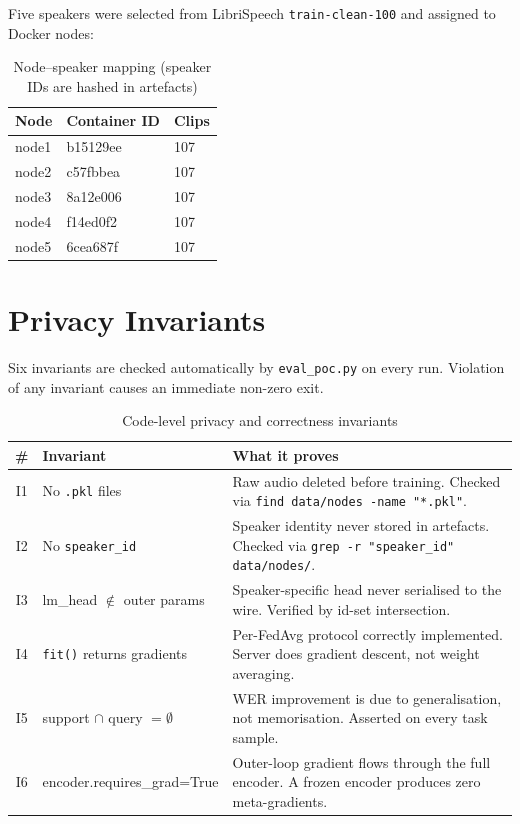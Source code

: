 \documentclass[11pt,a4paper]{article}
\theoremstyle{definition}
\begin{document}
Five speakers were selected from LibriSpeech \texttt{train-clean-100} and
assigned to Docker nodes:

\begin{table}[H]
\centering
\caption{Node--speaker mapping (speaker IDs are hashed in artefacts)}
\begin{tabular}{lll}
\toprule
\textbf{Node} & \textbf{Container ID} & \textbf{Clips}\\
\midrule
node1 & b15129ee & 107\\
node2 & c57fbbea & 107\\
node3 & 8a12e006 & 107\\
node4 & f14ed0f2 & 107\\
node5 & 6cea687f & 107\\
\bottomrule
\end{tabular}
\end{table}

\section{Privacy Invariants}

\label{sec:invariants}

Six invariants are checked automatically by \texttt{eval\_poc.py} on every run.
Violation of any invariant causes an immediate non-zero exit.

\begin{table}[H]
\centering
\caption{Code-level privacy and correctness invariants}
\label{tab:invariants}
\begin{tabular}{clp{7cm}}
\toprule
\textbf{\#} & \textbf{Invariant} & \textbf{What it proves}\\
\midrule
I1 & No \texttt{.pkl} files & Raw audio deleted before training.  Checked via
     \texttt{find data/nodes -name "*.pkl"}.\\
I2 & No \texttt{speaker\_id} & Speaker identity never stored in artefacts.
     Checked via \texttt{grep -r "speaker\_id" data/nodes/}.\\
I3 & lm\_head $\notin$ outer params & Speaker-specific head never serialised to
     the wire.  Verified by id-set intersection.\\
I4 & \texttt{fit()} returns gradients & Per-FedAvg protocol correctly implemented.
     Server does gradient descent, not weight averaging.\\
I5 & support $\cap$ query $= \emptyset$ & WER improvement is due to
     generalisation, not memorisation.  Asserted on every task sample.\\
I6 & encoder.requires\_grad=True & Outer-loop gradient flows through the full
     encoder.  A frozen encoder produces zero meta-gradients.\\
\bottomrule
\end{tabular}
\end{table}
\end{document}
